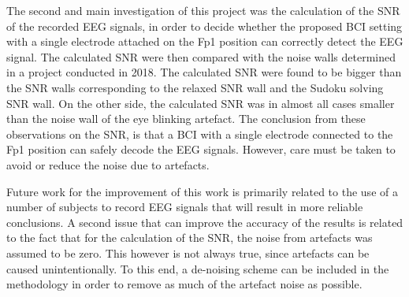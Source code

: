 The second and main investigation of this project was the calculation of the SNR of the recorded EEG signals, in order to decide whether the proposed BCI setting with a single electrode attached on the Fp1 position can correctly detect the EEG signal. The calculated SNR were then compared with the noise walls determined in a project conducted in 2018.  The calculated SNR were found to be bigger than the SNR walls corresponding to the relaxed SNR wall and the Sudoku solving SNR wall. On the other side, the calculated SNR was in almost all cases smaller than the noise wall of the eye blinking artefact. The conclusion from these observations on the SNR, is that a BCI with a single electrode connected to the Fp1 position can safely decode the EEG signals. However, care must be taken to avoid or reduce the noise due to artefacts.

Future work for the improvement of this work is primarily related to the use of a number of subjects to record EEG signals that will result in more reliable conclusions. A second issue that can improve the accuracy of the results is related to the fact that for the calculation of the SNR, the noise from artefacts was assumed to be zero. This however is not always true, since artefacts can be caused unintentionally. To this end, a de-noising scheme can be included in the methodology in order to remove as much of the artefact noise as possible. 
